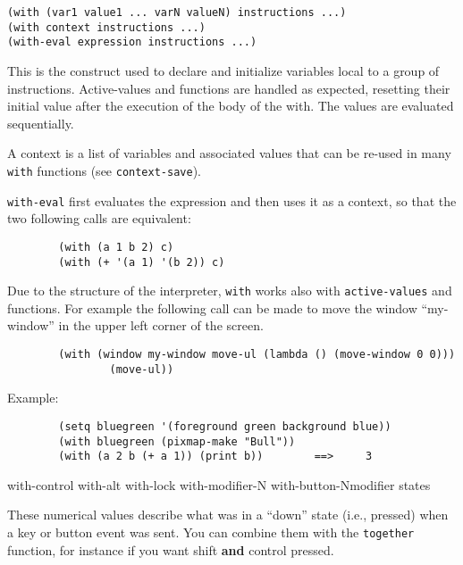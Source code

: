         
{\usagefont\begin{verbatim}
(with (var1 value1 ... varN valueN) instructions ...)
(with context instructions ...)
(with-eval expression instructions ...)
\end{verbatim}}\usageupspace

This is the construct used to declare and initialize variables local to a
group of instructions. Active-values and functions are handled as expected,
resetting their initial value after the execution of the body of the with.
The values are evaluated sequentially.

A context is a list of variables and associated values that can be re-used
in many \verb"with" functions (see \verb"context-save").

\verb"with-eval" first evaluates the expression and then uses it as a
context, so that the two following calls are equivalent:

{\exemplefont\begin{verbatim}
        (with (a 1 b 2) c)
        (with (+ '(a 1) '(b 2)) c)
\end{verbatim}}

Due to the structure of the {\WOOL} interpreter, \verb"with" works also with
\verb"active-values" and functions. 
For example the following call can be made to
move the window ``my-window'' in the upper left corner of the screen.

{\exemplefont\begin{verbatim}
        (with (window my-window move-ul (lambda () (move-window 0 0)))
                (move-ul))
\end{verbatim}} 

Example: {\exemplefont\upspace\begin{verbatim}
        (setq bluegreen '(foreground green background blue))
        (with bluegreen (pixmap-make "Bull"))
        (with (a 2 b (+ a 1)) (print b))        ==>     3
\end{verbatim}}

        {with-control}
        {with-alt}
        {with-lock}
        {with-modifier-N}
        {with-button-N}{modifier states}
        

These numerical values describe what was in a ``down'' state (i.e., pressed)
when a key or button event was sent. You can combine them with the
\verb"together" function, for instance if you want shift {\bf and} control 
pressed.

